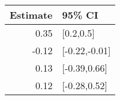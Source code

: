 \begin{tabular}{rl}
  \hline
Estimate & 95\% CI \\ 
  \hline
0.35 & [0.2,0.5] \\ 
  -0.12 & [-0.22,-0.01] \\ 
  0.13 & [-0.39,0.66] \\ 
  0.12 & [-0.28,0.52] \\ 
   \hline
\end{tabular}

